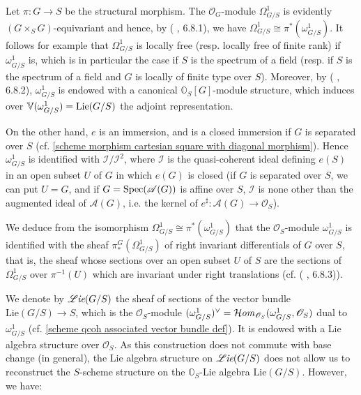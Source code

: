 \begin{remark}\label{scheme group omega_G/S differential module prop}
Let $\pi:G\to S$ be the structural morphism. The $\mathscr{O}_G$-module $\Omega_{G/S}^1$ is evidently $(G\times_SG)$-equivariant and hence, by (\cite{SGA3-1} , 6.8.1), we have $\Omega_{G/S}^1\cong\pi^*(\omega_{G/S}^1)$. It follows for example that $\Omega_{G/S}^1$ is locally free (resp. locally free of finite rank) if $\omega_{G/S}^1$ is, which is in particular the case if $S$ is the spectrum of a field (resp. if $S$ is the spectrum of a field and $G$ is locally of finite type over $S$). Moreover, by (\cite{SGA3-1} , 6.8.2), $\omega_{G/S}^1$ is endowed with a canonical $\mathbb{O}_S[G]$-module structure, which induces over $\mathbb{V}(\omega_{G/S}^1)=\mathrm{Lie}(G/S)$ the adjoint representation.\par
On the other hand, $e$ is an immersion, and is a closed immersion if $G$ is separated over $S$ (cf. \cref{scheme morphism cartesian square with diagonal morphism}). Hence $\omega_{G/S}^1$ is identified with $\mathscr{I}/\mathscr{I}^2$, where $\mathscr{I}$ is the quasi-coherent ideal defining $e(S)$ in an open subset $U$ of $G$ in which $e(G)$ is closed (if $G$ is separated over $S$, we can put $U=G$, and if $G=\mathrm{Spec}(\mathscr{A}(G))$ is affine over $S$, $\mathscr{I}$ is none other than the augmented ideal of $\mathscr{A}(G)$, i.e. the kernel of $e^{\sharp}:\mathscr{A}(G)\to\mathscr{O}_S$).
\end{remark}

\begin{remark}\label{scheme group omega_G/S invariant sheaf of differential}
We deduce from the isomorphism $\Omega_{G/S}^1\cong\pi^*(\omega_{G/S}^1)$ that the $\mathscr{O}_S$-module $\omega_{G/S}^1$ is identified with the sheaf $\pi_*^G(\Omega_{G/S}^1)$ of right invariant differentials of $G$ over $S$, that is, the sheaf whose sections over an open subset $U$ of $S$ are the sections of $\Omega_{G/S}^1$ over $\pi^{-1}(U)$ which are invariant under right translations (cf. (\cite{SGA3-1} , 6.8.3)).
\end{remark}

We denote by $\operatorname{\mathscr{L}\hspace*{-0.5pt}\textit{ie}}(G/S)$ the sheaf of sections of the vector bundle $\mathrm{Lie}(G/S)\to S$, which is the $\mathscr{O}_S$-module $(\omega_{G/S}^1)^{\vee}=\operatorname{\mathcal{H}\hspace*{-0.4pt}\textit{om}\hspace{0.5pt}}_{\mathscr{O}_S}(\omega_{G/S}^1,\mathscr{O}_S)$ dual to $\omega_{G/S}^1$ (cf. \cref{scheme qcoh associated vector bundle def}). It is endowed with a Lie algebra structure over $\mathscr{O}_S$. As this construction does not commute with base change (in general), the Lie algebra structure on $\operatorname{\mathscr{L}\hspace*{-0.5pt}\textit{ie}}(G/S)$ does not allow us to reconstruct the $S$-scheme structure on the $\mathbb{O}_S$-Lie algebra $\mathrm{Lie}(G/S)$. However, we have:

